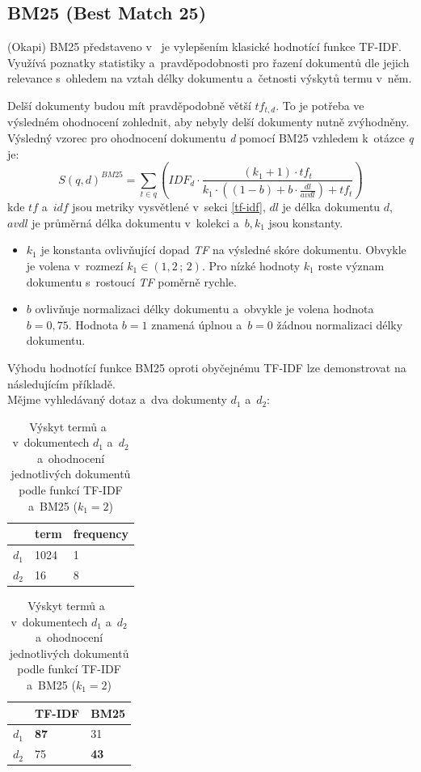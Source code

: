 \subsection{BM25 (Best Match 25)}
\label{bm25}
(Okapi) BM25 představeno v~\cite{bm25} je vylepšením klasické hodnotící funkce TF-IDF. Využívá poznatky statistiky a~pravděpodobnosti pro řazení dokumentů dle jejich relevance s~ohledem na vztah délky dokumentu a~četnosti výskytů termu v~něm.\par
Delší dokumenty budou mít pravděpodobně větší $tf_{t,d}$. To je potřeba ve výsledném ohodnocení zohlednit, aby nebyly delší dokumenty nutně zvýhodněny.
Výsledný vzorec pro ohodnocení dokumentu \emph{d} pomocí BM25 vzhledem k~otázce \emph{q} je:
\begin{equation}
    S(q,d)^{BM25} = \sum_{t \in q} \left(IDF_d \cdot \frac{(k_1+1)\cdot tf_t}{k_1\cdot ((1-b)+b \cdot \frac{dl}{avdl}) + tf_t}\right)
\end{equation}
kde $tf$ a~$idf$ jsou metriky vysvětlené v~sekci \ref{tf-idf}, $dl$ je délka dokumentu $d$, $avdl$ je průměrná délka dokumentu v~kolekci a~$b,k_1$ jsou konstanty.
\begin{itemize}
    \item $k_1$ je konstanta ovlivňující dopad \emph{TF} na výsledné skóre dokumentu. Obvykle je volena v~rozmezí $k_1\in(1,2\,;\,2)$. Pro nízké hodnoty $k_1$ roste význam dokumentu s~rostoucí \emph{TF} poměrně rychle.
    \item $b$ ovlivňuje normalizaci délky dokumentu a~obvykle je volena hodnota $b=0,75$. Hodnota $b=1$ znamená úplnou a~$b=0$ žádnou normalizaci délky dokumentu.
\end{itemize}

Výhodu hodnotící funkce BM25 oproti obyčejnému TF-IDF lze demonstrovat na následujícím příkladě.\\ \medskip
Mějme vyhledávaný dotaz  a~dva dokumenty $d_1$ a~$d_2$:\par

\begin{table}[H]
\centering
\begin{tabular}{|c|l|l|}
\hline
      & term & frequency \\ \hline
$d_1$ & 1024 & 1         \\ \hline
$d_2$ & 16   & 8         \\ \hline
\end{tabular}
\begin{tabular}{|c|l|l|}
\hline
      & \textbf{TF-IDF} & \textbf{BM25} \\ \hline
$d_1$ & \textbf{87} & 31         \\ \hline
$d_2$ & 75 & \textbf{43}         \\ \hline
\end{tabular}
\caption{Výskyt termů  a~ v~dokumentech $d_1$ a~$d_2$ a~ohodnocení jednotlivých dokumentů podle funkcí TF-IDF a~BM25 ($k_1 = 2$)}
\label{tab:tf}
\end{table}

